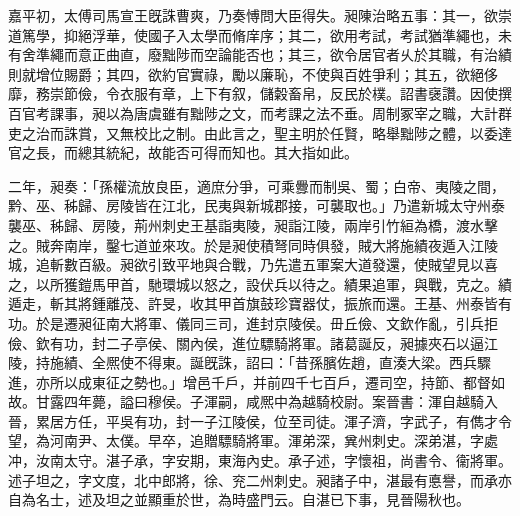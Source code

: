 \begin{pinyinscope}
嘉平初，太傅司馬宣王旣誅曹爽，乃奏愽問大臣得失。昶陳治略五事：其一，欲崇道篤學，抑絕浮華，使國子入太學而脩庠序；其二，欲用考試，考試猶準繩也，未有舍準繩而意正曲直，廢黜陟而空論能否也；其三，欲令居官者乆於其職，有治績則就增位賜爵；其四，欲約官實祿，勵以廉恥，不使與百姓爭利；其五，欲絕侈靡，務崇節儉，令衣服有章，上下有叙，儲糓畜帛，反民於樸。詔書襃讚。因使撰百官考課事，昶以為唐虞雖有黜陟之文，而考課之法不垂。周制冢宰之職，大計群吏之治而誅賞，又無校比之制。由此言之，聖主明於任賢，略舉黜陟之體，以委達官之長，而總其統紀，故能否可得而知也。其大指如此。

二年，昶奏：「孫權流放良臣，適庶分爭，可乘釁而制吳、蜀；白帝、夷陵之間，黔、巫、秭歸、房陵皆在江北，民夷與新城郡接，可襲取也。」乃遣新城太守州泰襲巫、秭歸、房陵，荊州刺史王基詣夷陵，昶詣江陵，兩岸引竹絙為橋，渡水擊之。賊奔南岸，鑿七道並來攻。於是昶使積弩同時俱發，賊大將施績夜遁入江陵城，追斬數百級。昶欲引致平地與合戰，乃先遣五軍案大道發還，使賊望見以喜之，以所獲鎧馬甲首，馳環城以怒之，設伏兵以待之。績果追軍，與戰，克之。績遁走，斬其將鍾離茂、許旻，收其甲首旗鼓珍寶器仗，振旅而還。王基、州泰皆有功。於是遷昶征南大將軍、儀同三司，進封京陵侯。毌丘儉、文欽作亂，引兵拒儉、欽有功，封二子亭侯、關內侯，進位驃騎將軍。諸葛誕反，昶據夾石以逼江陵，持施績、全熈使不得東。誕旣誅，詔曰：「昔孫臏佐趙，直湊大梁。西兵驟進，亦所以成東征之勢也。」增邑千戶，并前四千七百戶，遷司空，持節、都督如故。甘露四年薨，謚曰穆侯。子渾嗣，咸熈中為越騎校尉。案晉書：渾自越騎入晉，累居方任，平吳有功，封一子江陵侯，位至司徒。渾子濟，字武子，有儁才令望，為河南尹、太僕。早卒，追贈驃騎將軍。渾弟深，兾州刺史。深弟湛，字處冲，汝南太守。湛子承，字安期，東海內史。承子述，字懷祖，尚書令、衞將軍。述子坦之，字文度，北中郎將，徐、兖二州刺史。昶諸子中，湛最有悳譽，而承亦自為名士，述及坦之並顯重於世，為時盛門云。自湛已下事，見晉陽秋也。


\end{pinyinscope}